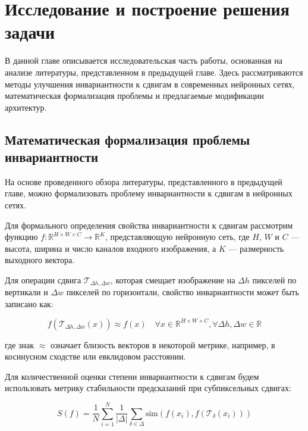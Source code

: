 \section{Исследование и построение решения задачи}
\label{sec:Chapter3} 

В данной главе описывается исследовательская часть работы, основанная на анализе литературы, представленном в предыдущей главе. Здесь рассматриваются методы улучшения инвариантности к сдвигам в современных нейронных сетях, математическая формализация проблемы и предлагаемые модификации архитектур.

\subsection{Математическая формализация проблемы инвариантности}
\label{sec:math}

На основе проведенного обзора литературы, представленного в предыдущей главе, можно формализовать проблему инвариантности к сдвигам в нейронных сетях. 

Для формального определения свойства инвариантности к сдвигам рассмотрим функцию $f: \mathbb{R}^{H \times W \times C} \rightarrow \mathbb{R}^K$, представляющую нейронную сеть, где $H$, $W$ и $C$ — высота, ширина и число каналов входного изображения, а $K$ — размерность выходного вектора.

Для операции сдвига $\mathcal{T}_{\Delta h, \Delta w}$, которая смещает изображение на $\Delta h$ пикселей по вертикали и $\Delta w$ пикселей по горизонтали, свойство инвариантности может быть записано как:

\begin{equation}
f(\mathcal{T}_{\Delta h, \Delta w}(x)) \approx f(x) \quad \forall x \in \mathbb{R}^{H \times W \times C}, \forall \Delta h, \Delta w \in \mathbb{R}
\end{equation}

где знак $\approx$ означает близость векторов в некоторой метрике, например, в косинусном сходстве или евклидовом расстоянии.

Для количественной оценки степени инвариантности к сдвигам будем использовать метрику стабильности предсказаний при субпиксельных сдвигах:

\begin{equation}
S(f) = \frac{1}{N}\sum_{i=1}^{N} \frac{1}{|\Delta|} \sum_{\delta \in \Delta} \text{sim}(f(x_i), f(\mathcal{T}_\delta(x_i)))
\end{equation}

